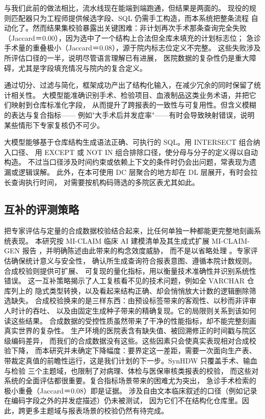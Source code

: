 \documentclass[11pt,a4paper]{article}
\begin{document}
与我们此前的做法相比，流水线现在能端到端跑通，但结果是两面的。
现役的规则匹配器只为工程师提供候选字段、SQL 仍需手工构造，而本系统把整条流程
自动化了。然而结果集校验暴露出关键困难：非计划再次手术那条查询完全失败
（Jaccard＝0.00），因为选中了一个结构上合法但全库未填充的计划标志位；
急诊手术量的重叠极小（Jaccard＝0.08），源于院内标志位定义不完整。
这些失败涉及所评估口径的一半，说明尽管语言理解已有进展，
医院数据的复杂性仍是重大障碍，尤其是字段填充情况与院内的复合定义。

通过切分、过滤与简化，框架成功产出了结构化输入，在减少冗余的同时保留了统计相关性。
大模型能准确识别手术、检验项目、血液制品这类业务术语，并把它们映射到仓库标准化字段，
从而提升了跨报表的一致性与可复用性。但含义模糊的表达与复合指标——
例如"大手术后并发症率"——有时会导致映射错误，说明某些情形下专家复核仍不可少。

大模型能够基于仓库结构生成语法正确、可执行的 SQL。用 INTERSECT 组合纳入口径、
用 EXCEPT 或 NOT IN 组合排除口径，使分母与分子的定义得以自动构造。
不过当口径涉及时间约束或依赖上下文的条件时仍会出问题，常表现为遗漏或逻辑误解。
此外，在本可使用 DC 层聚合的地方却在 DL 层展开，有时会拉长查询执行时间，
对需要按机构码筛选的多院区表尤其如此。

\subsection{互补的评测策略}
把专家评估与定量的合成数据校验结合起来，比任何单独一种都能更完整地刻画系统表现。
本研究按 MI-CLAIM 临床 AI 建模清单及其生成式扩展 MI-CLAIM-GEN 报告
\cite{miclaim2020,miclaimgen2024}，并明确陈述由此带来的构念效度威胁，
而不是以省略处理 \cite{validity2023}。专家评估确保统计意义与安全性，
确认所生成查询符合报表意图、遵循本院计数规则。合成校验则提供可扩展、
可复现的量化指标，用以衡量技术准确性并识别系统性错误。
这一互补策略揭示了人工复核看不见的技术问题，例如全 VARCHAR 仓库列上的
隐式类型转换，以及看起来结构正确、却会悄悄放大计数的逻辑删除筛选缺失。
合成校验换来的是三样东西：由预设标签带来的客观性、以秒而非评审人时计的吞吐、
以及由固定生成种子带来的精确复现。它的局限则关系到该如何读这些结果。
合成数据的受控性质虽然带来了干净的性能指标，却不能完整刻画真实世界的复杂性。
生产环境的医院表含有缺失值、被回溯修正的时间戳与院区级编码差异，
而我们的合成数据没有这些。这些因素只会使真实表现相对合成校验下降，
而本研究并未确定下降幅度：要界定这一差距，需要一次面向生产表、
带裁定真值的前瞻性运行，这是我们计划的下一步。SynHDW 只覆盖手术、输血与检验
三个主题域，也限制了对病理、体检与医保审核类报表的校验，
而这些对系统的全面评估都很重要。复合指标场景带来的困难尤为突出，
急诊手术检索的极小重叠（Jaccard＝0.08）即是证据。
涉及自由文本临床叙述的口径（例如记录在编码字段之外的并发症描述）仍未被测试，
因为它们不在结构化仓库里。因此，跨更多主题域与报表场景的校验仍然有待完成。
\end{document}
